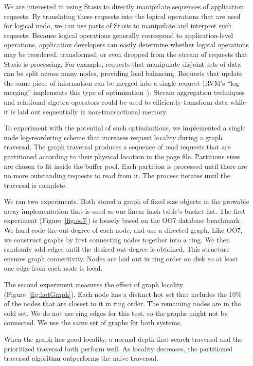 \documentclass[letterpaper,twocolumn,10pt]{article}
\newcommand{\yad}{Stasis\xspace}
\begin{document}
We are interested in using \yad to directly manipulate sequences of
application requests.  By translating these requests into the logical
operations that are used for logical undo, we can use parts of \yad to
manipulate and interpret such requests.  Because logical operations generally
correspond to application-level operations, application developers can easily determine whether
logical operations may be reordered, transformed, or even dropped from
the stream of requests that \yad is processing.  For example,
requests that manipulate disjoint sets of data can be split across
many nodes, providing load balancing.  Requests that update the same piece of information
can be merged into a single request (RVM's ``log merging''
implements this type of optimization~\cite{lrvm}).  Stream aggregation
techniques and relational algebra operators could be used to
efficiently transform data while it is laid out sequentially in
non-transactional memory.

To experiment with the potential of such optimizations, we implemented
a single node log-reordering scheme that increases request locality
during a graph traversal.  The graph traversal produces a sequence of
read requests that are partitioned according to their physical
location in the page file.  Partitions sizes are chosen to fit inside
the buffer pool.  Each partition is processed until there are no more
outstanding requests to read from it.  The process iterates until the
traversal is complete.

We ran two experiments.  Both stored a graph of fixed size objects in
the growable array implementation that is used as our linear
hash table's bucket list.
The first experiment (Figure~\ref{fig:oo7})
is loosely based on the OO7 database benchmark~\cite{oo7}.  We
hard-code the out-degree of each node, and use a directed graph.  Like OO7, we
construct graphs by first connecting nodes together into a ring.
We then randomly add edges until the desired
out-degree is obtained.  This structure ensures graph connectivity.
Nodes are laid out in ring order on disk so at least
one edge from each node is local.

The second experiment measures the effect of graph locality
(Figure~\ref{fig:hotGraph}).  Each node has a distinct hot set that
includes the 10\% of the nodes that are closest to it in ring order.
The remaining nodes are in the cold set.  We do not use ring edges for
this test, so the graphs might not be connected. We use the same set
of graphs for both systems.

When the graph has good locality, a normal depth first search
traversal and the prioritized traversal both perform well.  As
locality decreases, the partitioned traversal algorithm outperforms
the naive traversal.
\end{document}
